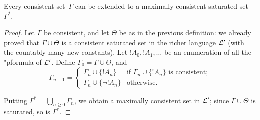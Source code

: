\documentclass[../../include/open-logic-section]{subfiles}
\begin{document}

\begin{lem}
Every consistent set~$\Gamma$ can be extended to a maximally
consistent saturated set~$\Gamma^*$.
\end{lem}

\begin{proof}
Let $\Gamma$ be consistent, and let $\Theta$ be as in the previous
definition: we already proved that $\Gamma \cup \Theta$ is a
consistent saturated set in the richer language $\mathcal L'$ (with the
countably many new constants). Let $!A_0, !A_1, \dots$ be an
enumeration of all the "p{formula} of $\mathcal L'$. Define $\Gamma_0 =
\Gamma \cup \Theta$, and
\[
\Gamma_{n+1} =
\begin{cases}
\Gamma_n \cup \{ !A_n \} & \textrm{if $\Gamma_n \cup \{!A_n\}$ is
  consistent;} \\ 
\Gamma_n \cup \{ \lnot !A_n \} & \textrm{otherwise.}
\end{cases}
\]

Putting $\Gamma^* = \bigcup_{n \geq 0} \Gamma_n$, we obtain a maximally consistent 
set in $\mathcal L'$; since $\Gamma \cup \Theta$ is saturated, so is $\Gamma^*$. 

\end{proof}
\end{document}
